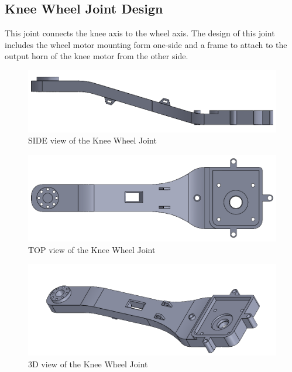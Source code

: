 \subsection{Knee Wheel Joint Design}
This joint connects the knee axis to the wheel axis. The design of this joint includes the wheel motor mounting form one-side and a frame to attach to the output horn of the knee motor from the other side.
\begin{figure}[h]
	\centering
	\includegraphics[width=1\linewidth]{Wheel_Knee_Joint_1}
	\caption[SIDE view of the Knee Wheel Joint]{SIDE view of the Knee Wheel Joint}
	\label{fig:wheelkneejoint1}
\end{figure}
\begin{figure}[h]
	\centering
	\includegraphics[width=1\linewidth]{Wheel_Knee_Joint_2}
	\caption[TOP view of the Knee Wheel Joint]{TOP view of the Knee Wheel Joint}
	\label{fig:wheelkneejoint2}
\end{figure}
\begin{figure}[h]
	\centering
	\includegraphics[width=1\linewidth]{Wheel_Knee_Joint_3}
	\caption[3D view of the Knee Wheel Joint]{3D view of the Knee Wheel Joint}
	\label{fig:wheelkneejoint3}
\end{figure}

